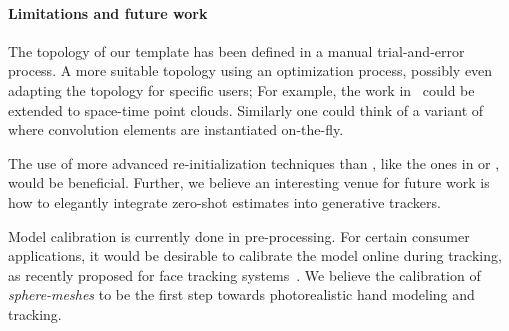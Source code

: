 \paragraph{Limitations and future work} 
The topology of our template has been defined in a manual trial-and-error process. A more suitable topology  using an optimization process, possibly even adapting the topology for specific users; For example, the work in~\cite{thiery2016spheremesh} could be extended to space-time point clouds. Similarly one could think of a variant of~\cite{newcombe2015dynfusion} where convolution elements are instantiated on-the-fly.
% 
\begin{draft}
The use of more advanced re-initialization techniques than \cite{qian2014realtime}, like the ones in \cite{krupka2014discriminative} or \cite{oberweger2015hands}, would be beneficial. Further, we believe an interesting venue for future work is how to elegantly integrate zero-shot estimates into generative trackers.
\end{draft}
% 
Model calibration is currently done in pre-processing. For certain consumer applications, it would be desirable to calibrate the model online during tracking, as recently proposed for face tracking systems~\cite{bouaziz2013online}. 
% 
We believe the calibration of \emph{sphere-meshes} to be the first step towards photorealistic hand modeling and tracking. 
%


